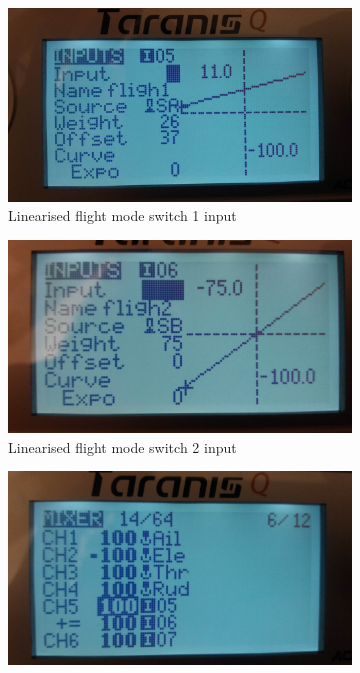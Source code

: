 \begin{figure}[H]
\begin{subfigure}{0.5\textwidth}
\centering
\includegraphics[scale=0.13]{images/lcd/flight_mode_but_1.jpg}
\caption{Linearised flight mode switch 1 input}
\label{fig:taranis_fm_but1}
\end{subfigure}
\begin{subfigure}{0.5\textwidth}
\centering
\includegraphics[scale=0.13]{images/lcd/flight_mode_but_2.jpg}
\caption{Linearised flight mode switch 2 input}
\label{fig:taranis_fm_but2}
\end{subfigure}
\begin{subfigure}{0.5\textwidth}
\centering
\includegraphics[scale=0.13]{images/lcd/mixer.jpg}

\end{subfigure}
\end{figure}

